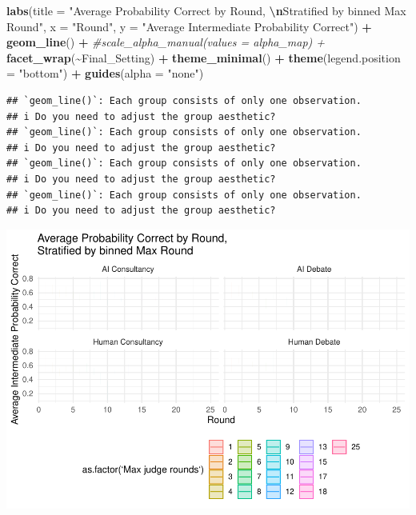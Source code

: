 \documentclass[
]{article}
\newenvironment{Shaded}{\begin{snugshade}}{\end{snugshade}}
\newcommand{\AttributeTok}[1]{\textcolor[rgb]{0.13,0.29,0.53}{#1}}
\newcommand{\CommentTok}[1]{\textcolor[rgb]{0.56,0.35,0.01}{\textit{#1}}}
\newcommand{\FunctionTok}[1]{\textcolor[rgb]{0.13,0.29,0.53}{\textbf{#1}}}
\newcommand{\NormalTok}[1]{#1}
\newcommand{\SpecialCharTok}[1]{\textcolor[rgb]{0.81,0.36,0.00}{\textbf{#1}}}
\newcommand{\StringTok}[1]{\textcolor[rgb]{0.31,0.60,0.02}{#1}}
\begin{document}
\begin{Shaded}
\begin{Highlighting}[]
  \FunctionTok{labs}\NormalTok{(}\AttributeTok{title =} \StringTok{"Average Probability Correct by Round, }\SpecialCharTok{\textbackslash{}n}\StringTok{Stratified by binned Max Round"}\NormalTok{,}
       \AttributeTok{x =} \StringTok{"Round"}\NormalTok{, }
       \AttributeTok{y =} \StringTok{"Average Intermediate Probability Correct"}\NormalTok{) }\SpecialCharTok{+}
  \FunctionTok{geom\_line}\NormalTok{() }\SpecialCharTok{+}
  \CommentTok{\#scale\_alpha\_manual(values = alpha\_map) +}
  \FunctionTok{facet\_wrap}\NormalTok{(}\SpecialCharTok{\textasciitilde{}}\NormalTok{Final\_Setting) }\SpecialCharTok{+}
  \FunctionTok{theme\_minimal}\NormalTok{() }\SpecialCharTok{+}
  \FunctionTok{theme}\NormalTok{(}\AttributeTok{legend.position =} \StringTok{"bottom"}\NormalTok{) }\SpecialCharTok{+}
  \FunctionTok{guides}\NormalTok{(}\AttributeTok{alpha =} \StringTok{"none"}\NormalTok{)}
\end{Highlighting}
\end{Shaded}

\begin{verbatim}
## `geom_line()`: Each group consists of only one observation.
## i Do you need to adjust the group aesthetic?
## `geom_line()`: Each group consists of only one observation.
## i Do you need to adjust the group aesthetic?
## `geom_line()`: Each group consists of only one observation.
## i Do you need to adjust the group aesthetic?
## `geom_line()`: Each group consists of only one observation.
## i Do you need to adjust the group aesthetic?
\end{verbatim}

\includegraphics{debate-2309_files/figure-latex/strat ggplot-1.pdf}
\end{document}

